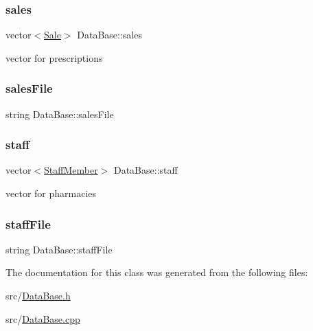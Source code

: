\mbox{\label{classDataBase_a4e48e9c0e840c7f9febf3344c5a003ba}} 
\subsubsection{\texorpdfstring{sales}{sales}}
{\footnotesize\ttfamily vector$<$\hyperlink{classSale}{Sale}$>$ Data\+Base\+::sales\hspace{0.3cm}{\ttfamily [private]}}



vector for prescriptions 

\mbox{\label{classDataBase_a8b16f4814de788f12e96163255aaa737}} 
\subsubsection{\texorpdfstring{sales\+File}{salesFile}}
{\footnotesize\ttfamily string Data\+Base\+::sales\+File\hspace{0.3cm}{\ttfamily [private]}}

\mbox{\label{classDataBase_a74729cf98d5b60cc2bfbac6c0fa00229}} 
\subsubsection{\texorpdfstring{staff}{staff}}
{\footnotesize\ttfamily vector$<$\hyperlink{classStaffMember}{Staff\+Member}$>$ Data\+Base\+::staff\hspace{0.3cm}{\ttfamily [private]}}



vector for pharmacies 

\mbox{\label{classDataBase_a2f564a52132d74186314695a7a0e3270}} 
\subsubsection{\texorpdfstring{staff\+File}{staffFile}}
{\footnotesize\ttfamily string Data\+Base\+::staff\+File\hspace{0.3cm}{\ttfamily [private]}}



The documentation for this class was generated from the following files\+:\begin{DoxyCompactItemize}
\item 
src/\hyperlink{DataBase_8h}{Data\+Base.\+h}\item 
src/\hyperlink{DataBase_8cpp}{Data\+Base.\+cpp}\end{DoxyCompactItemize}
